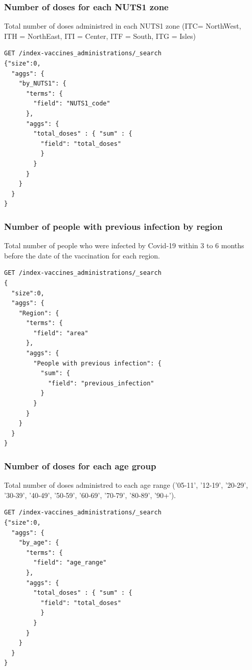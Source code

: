 \documentclass[12pt, a4paper]{article}
\begin{document}
\subsubsection{Number of doses for each NUTS1 zone}
Total number of doses administred in each NUTS1 zone (ITC= NorthWest, \\ 
ITH = NorthEast, ITI = Center, ITF = South, ITG = Isles)
\begin{tcolorbox}[fontupper=\scriptsize]
  \begin{verbatim}
GET /index-vaccines_administrations/_search
{"size":0,
  "aggs": {
    "by_NUTS1": {
      "terms": {
        "field": "NUTS1_code"
      },
      "aggs": {
        "total_doses" : { "sum" : {
          "field": "total_doses"
          }
        }
      }
    }
  }
}
  \end{verbatim}
\end{tcolorbox}

\subsubsection{Number of people with previous infection by region}
Total number of people who were infected by Covid-19 within 3 to 6 months before the 
date of the vaccination for each region.
\begin{tcolorbox}[fontupper=\scriptsize]
  \begin{verbatim}
GET /index-vaccines_administrations/_search
{
  "size":0,
  "aggs": {
    "Region": {
      "terms": {
        "field": "area"
      },
      "aggs": {
        "People with previous infection": {
          "sum": {
            "field": "previous_infection"
          }
        }
      }
    }
  }
}
  \end{verbatim}
\end{tcolorbox}

\subsubsection{Number of doses for each age group}
Total number of doses administred to each age range ('05-11', '12-19', '20-29', '30-39',
'40-49', '50-59', '60-69', '70-79', '80-89', '90+').
\begin{tcolorbox}[fontupper=\scriptsize]
  \begin{verbatim}
GET /index-vaccines_administrations/_search
{"size":0,
  "aggs": {
    "by_age": {
      "terms": {
        "field": "age_range"
      },
      "aggs": {
        "total_doses" : { "sum" : { 
          "field": "total_doses"
          }
        }
      }
    }
  }
}
  \end{verbatim}
\end{tcolorbox}
\end{document}
